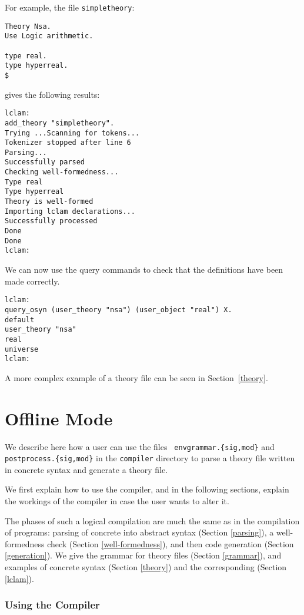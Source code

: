 For example, the file {\tt simpletheory}:
\begin{verbatim}
Theory Nsa.
Use Logic arithmetic.

type real.
type hyperreal.
$
\end{verbatim}
gives the following results:
\begin{verbatim}
lclam:
add_theory "simpletheory".
Trying ...Scanning for tokens...
Tokenizer stopped after line 6
Parsing...
Successfully parsed
Checking well-formedness...
Type real
Type hyperreal
Theory is well-formed
Importing lclam declarations...
Successfully processed
Done
Done
lclam:
\end{verbatim}
We can now use the query commands to check that the definitions have been made
correctly.
\begin{verbatim}
lclam:
query_osyn (user_theory "nsa") (user_object "real") X.
default
user_theory "nsa"
real
universe
lclam:
\end{verbatim}

A more complex example of a theory file can be seen in
Section~\ref{theory}.

\section{Offline Mode}

We describe here how a user can use the files {\tt
  envgrammar.\{sig,mod\}} and\linebreak 
{\tt postprocess.\{sig,mod\}} in the
{\tt compiler} directory to parse a theory file written in concrete
syntax and generate a \lclam theory file.

We first explain how to use the compiler, and in the following
sections, explain the workings of the compiler in case the user wants
to alter it.

The phases of such a logical compilation are much the same as in the
compilation of programs: parsing of concrete into abstract syntax
(Section \ref{parsing}), a well-formedness check (Section
\ref{well-formedness}), and then code generation (Section
\ref{generation}). We give the grammar for theory files (Section
\ref{grammar}), and examples of concrete syntax (Section \ref{theory}) and
the corresponding \lclam (Section \ref{lclam}).


\subsubsection{Using the Compiler}\label{makefile}

